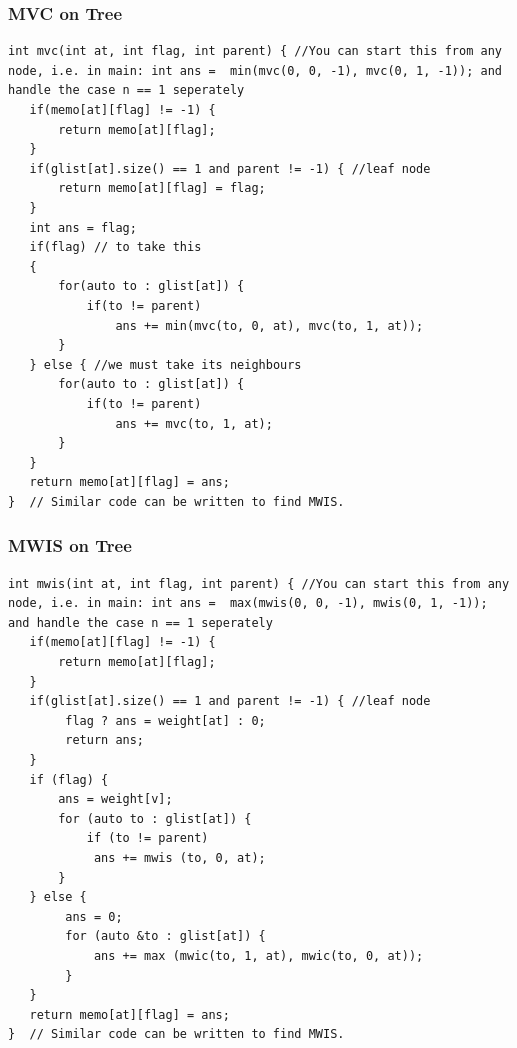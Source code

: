 \documentclass[8pt, a4paper, oneside, twocolumn]{extarticle}
\begin{document}
\subsubsection{MVC on Tree}
\begin{verbatim}
int mvc(int at, int flag, int parent) { //You can start this from any node, i.e. in main: int ans =  min(mvc(0, 0, -1), mvc(0, 1, -1)); and handle the case n == 1 seperately
   if(memo[at][flag] != -1) {
       return memo[at][flag];
   }
   if(glist[at].size() == 1 and parent != -1) { //leaf node
       return memo[at][flag] = flag;
   }
   int ans = flag;
   if(flag) // to take this
   {
       for(auto to : glist[at]) {
           if(to != parent)
               ans += min(mvc(to, 0, at), mvc(to, 1, at));
       }
   } else { //we must take its neighbours
       for(auto to : glist[at]) {
           if(to != parent)
               ans += mvc(to, 1, at);
       }
   }
   return memo[at][flag] = ans;
}  // Similar code can be written to find MWIS.
\end{verbatim}
\subsubsection{MWIS on Tree}
\begin{verbatim}
int mwis(int at, int flag, int parent) { //You can start this from any node, i.e. in main: int ans =  max(mwis(0, 0, -1), mwis(0, 1, -1)); and handle the case n == 1 seperately
   if(memo[at][flag] != -1) {
       return memo[at][flag];
   }
   if(glist[at].size() == 1 and parent != -1) { //leaf node
        flag ? ans = weight[at] : 0;
        return ans;
   }
   if (flag) {
       ans = weight[v];
       for (auto to : glist[at]) {
           if (to != parent)
            ans += mwis (to, 0, at);
       }
   } else {
        ans = 0;
        for (auto &to : glist[at]) {
            ans += max (mwic(to, 1, at), mwic(to, 0, at));
        }
   }
   return memo[at][flag] = ans;
}  // Similar code can be written to find MWIS.
\end{verbatim}
\end{document}
